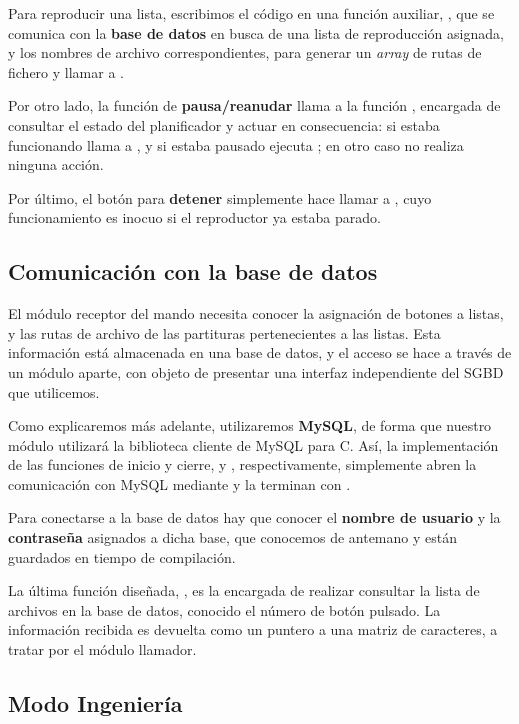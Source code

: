 Para reproducir una lista, escribimos el código en una función auxiliar, , que se comunica con la \textbf{base de datos} en busca de una lista de reproducción asignada, y los nombres de archivo correspondientes, para generar un \textit{array} de rutas de fichero y llamar a .

Por otro lado, la función de \textbf{pausa/reanudar} llama a la función , encargada de consultar el estado del planificador y actuar en consecuencia: si estaba funcionando llama a , y si estaba pausado ejecuta ; en otro caso no realiza ninguna acción.

Por último, el botón para \textbf{detener} simplemente hace llamar a , cuyo funcionamiento es inocuo si el reproductor ya estaba parado.

\subsection{Comunicación con la base de datos}

El módulo receptor del mando necesita conocer la asignación de botones a listas, y las rutas de archivo de las partituras pertenecientes a las listas. Esta información está almacenada en una base de datos, y el acceso se hace a través de un módulo aparte, con objeto de presentar una interfaz independiente del \acrshort{SGBD} que utilicemos.

Como explicaremos más adelante, utilizaremos \textbf{MySQL}, de forma que nuestro módulo utilizará la biblioteca cliente de MySQL para C. Así, la implementación de las funciones de inicio y cierre,  y , respectivamente, simplemente abren la comunicación con MySQL mediante  y la terminan con .

Para conectarse a la base de datos hay que conocer el \textbf{nombre de usuario} y la \textbf{contraseña} asignados a dicha base, que conocemos de antemano y están guardados en tiempo de compilación.

La última función diseñada, , es la encargada de realizar consultar la lista de archivos en la base de datos, conocido el número de botón pulsado. La información recibida es devuelta como un puntero a una matriz de caracteres, a tratar por el módulo llamador.

\subsection{Modo Ingeniería}

